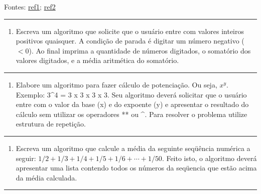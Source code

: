 \documentclass[12pt,a4paper]{article}
\renewcommand{\linethickness}{0.05em}
\providecommand{\tightlist}{%
      \setlength{\itemsep}{0pt}\setlength{\parskip}{0pt}}
\begin{document}
Fontes:
\href{https://docente.ifrn.edu.br/jonathanpereira/disciplinas/algoritmos/estruturas-de-repeticao/view}{ref1};
\href{https://www.inf.pucrs.br/~pinho/LaproI/Exercicios/Repeticao/Lista1.htm}{ref2}

    \begin{center}\rule{0.5\linewidth}{\linethickness}\end{center}

\begin{enumerate}
\def\labelenumi{\arabic{enumi}.}
\tightlist
\item
  Escreva um algoritmo que solicite que o usuário entre com valores
  inteiros positivos quaisquer. A condição de parada é digitar um número
  negativo (\(<0\)). Ao final imprima a quantidade de números digitados,
  o somatório dos valores digitados, e a média aritmética do somatório.
\end{enumerate}

    \begin{center}\rule{0.5\linewidth}{\linethickness}\end{center}

\begin{enumerate}
\def\labelenumi{\arabic{enumi}.}
\setcounter{enumi}{1}
\tightlist
\item
  Elabore um algoritmo para fazer cálculo de potenciação. Ou seja,
  \(x^y\). Exemplo: 3\^{}4 = 3 x 3 x 3 x 3. Seu algoritmo deverá
  solicitar que o usuário entre com o valor da base (x) e do expoente
  (y) e apresentar o resultado do cálculo sem utilizar os operadores **
  ou \^{}. Para resolver o problema utilize estrutura de repetição.
\end{enumerate}

    \begin{center}\rule{0.5\linewidth}{\linethickness}\end{center}

\begin{enumerate}
\def\labelenumi{\arabic{enumi}.}
\setcounter{enumi}{2}
\tightlist
\item
  Escreva um algoritmo que calcule a média da seguinte seqüência
  numérica a seguir: \(1/2 + 1/3 + 1/4 + 1/5 + 1/6 + \cdots + 1/50\).
  Feito isto, o algoritmo deverá apresentar uma lista contendo todos os
  números da seqüencia que estão acima da média calculada.
\end{enumerate}

    \begin{center}\rule{0.5\linewidth}{\linethickness}\end{center}
\end{document}
